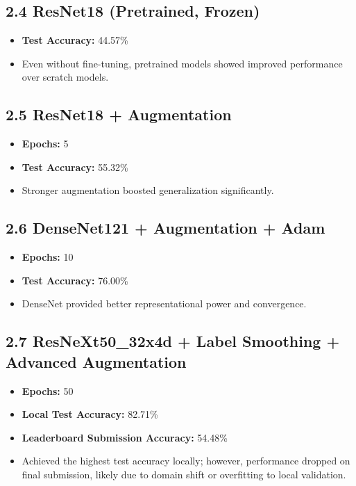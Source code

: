\documentclass{article}
\begin{document}
\subsection*{2.4 ResNet18 (Pretrained, Frozen)}
\begin{itemize}
    \item \textbf{Test Accuracy:} 44.57\%
    \item Even without fine-tuning, pretrained models showed improved performance over scratch models.
\end{itemize}

\subsection*{2.5 ResNet18 + Augmentation}
\begin{itemize}
    \item \textbf{Epochs:} 5
    \item \textbf{Test Accuracy:} 55.32\%
    \item Stronger augmentation boosted generalization significantly.
\end{itemize}

\subsection*{2.6 DenseNet121 + Augmentation + Adam}
\begin{itemize}
    \item \textbf{Epochs:} 10
    \item \textbf{Test Accuracy:} 76.00\%
    \item DenseNet provided better representational power and convergence.
\end{itemize}

\subsection*{2.7 ResNeXt50\_32x4d + Label Smoothing + Advanced Augmentation}
\begin{itemize}
    \item \textbf{Epochs:} 50
    \item \textbf{Local Test Accuracy:} 82.71\%
    \item \textbf{Leaderboard Submission Accuracy:} 54.48\%
    \item Achieved the highest test accuracy locally; however, performance dropped on final submission, likely due to domain shift or overfitting to local validation.
\end{itemize}
\end{document}
